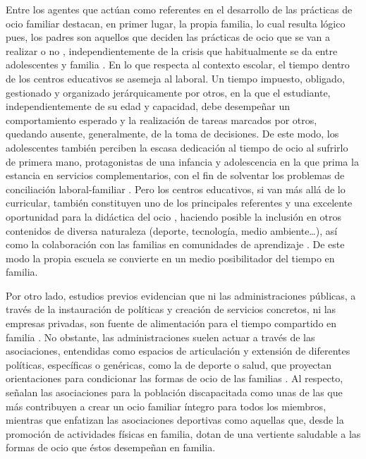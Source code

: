 \documentclass[spanish]{textolivre}
\begin{document}
Entre los agentes que actúan como referentes en el desarrollo de las prácticas de ocio familiar destacan, en primer lugar, la propia familia, lo cual resulta lógico pues, los padres son aquellos que deciden las prácticas de ocio que se van a realizar o no \cite{buswell2012}, independientemente de la crisis que habitualmente se da entre adolescentes y familia \cite{gomezcobos2008}. En lo que respecta al contexto escolar, el tiempo dentro de los centros educativos se asemeja al laboral. Un tiempo impuesto, obligado, gestionado y organizado jerárquicamente por otros, en la que el estudiante, independientemente de su edad y capacidad, debe desempeñar un comportamiento esperado y la realización de tareas marcados por otros, quedando ausente, generalmente, de la toma de decisiones. De este modo, los adolescentes también perciben la escasa dedicación al tiempo de ocio al sufrirlo de primera mano, protagonistas de una infancia y adolescencia en la que prima la estancia en servicios complementarios, con el fin de solventar los problemas de conciliación laboral-familiar \cite{martinezpampliega2019, varela2016}. Pero los centros educativos, si van más allá de lo curricular, también constituyen uno de los principales referentes y una excelente oportunidad para la didáctica del ocio \cite{gairin2004}, haciendo posible la inclusión en otros contenidos de diversa naturaleza (deporte, tecnología, medio ambiente…), así como la colaboración con las familias en comunidades de aprendizaje \cite{parra2020}. De este modo la propia escuela se convierte en un medio posibilitador del tiempo en familia.

Por otro lado, estudios previos evidencian que ni las administraciones públicas, a través de la instauración de políticas y creación de servicios concretos, ni las empresas privadas, son fuente de alimentación para el tiempo compartido en familia \cite{mchale2014}. No obstante, las administraciones suelen actuar a través de las asociaciones, entendidas como espacios de articulación y extensión de diferentes políticas, específicas o genéricas, como la de deporte o salud, que proyectan orientaciones para condicionar las formas de ocio de las familias \cite{king2015}. Al respecto, \textcite{freeman2003} señalan las asociaciones para la población discapacitada como unas de las que más contribuyen a crear un ocio familiar íntegro para todos los miembros, mientras que \textcite{hernandezprados2019} enfatizan las asociaciones deportivas como aquellas que, desde la promoción de actividades físicas en familia, dotan de una vertiente saludable a las formas de ocio que éstos desempeñan en familia.
\end{document}
